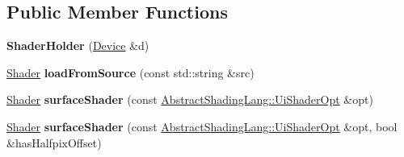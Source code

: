 \subsection*{Public Member Functions}
\begin{DoxyCompactItemize}
\item 
\hypertarget{class_tempest_1_1_shader_holder_a22231b83be39f0a272eb8b1f8555a66c}{{\bfseries Shader\+Holder} (\hyperlink{class_tempest_1_1_device}{Device} \&d)}\label{class_tempest_1_1_shader_holder_a22231b83be39f0a272eb8b1f8555a66c}

\item 
\hypertarget{class_tempest_1_1_shader_holder_ad79b0d7b4a709974cdcdb44cd0adf096}{\hyperlink{class_tempest_1_1_shader}{Shader} {\bfseries load\+From\+Source} (const std\+::string \&src)}\label{class_tempest_1_1_shader_holder_ad79b0d7b4a709974cdcdb44cd0adf096}

\item 
\hypertarget{class_tempest_1_1_shader_holder_aa54502f4023e847cdb1422b3ffbdb421}{\hyperlink{class_tempest_1_1_shader}{Shader} {\bfseries surface\+Shader} (const \hyperlink{struct_tempest_1_1_abstract_shading_lang_1_1_ui_shader_opt}{Abstract\+Shading\+Lang\+::\+Ui\+Shader\+Opt} \&opt)}\label{class_tempest_1_1_shader_holder_aa54502f4023e847cdb1422b3ffbdb421}

\item 
\hypertarget{class_tempest_1_1_shader_holder_aec59630023da00980523e5d665ef2183}{\hyperlink{class_tempest_1_1_shader}{Shader} {\bfseries surface\+Shader} (const \hyperlink{struct_tempest_1_1_abstract_shading_lang_1_1_ui_shader_opt}{Abstract\+Shading\+Lang\+::\+Ui\+Shader\+Opt} \&opt, bool \&has\+Halfpix\+Offset)}\label{class_tempest_1_1_shader_holder_aec59630023da00980523e5d665ef2183}

\end{DoxyCompactItemize}
